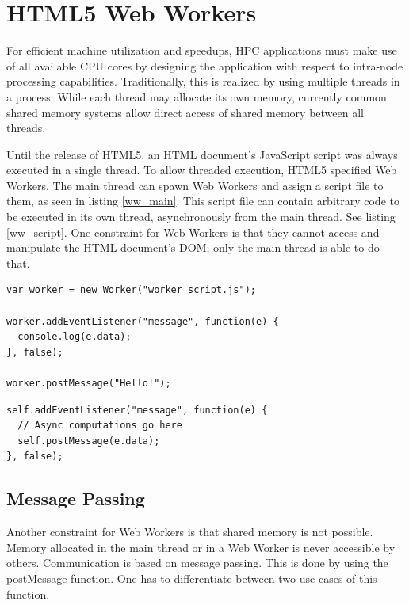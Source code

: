 \section{HTML5 Web Workers} \label{chapter_webworkers}

For efficient machine utilization and speedups, HPC applications must make use of all available CPU cores by designing the application with respect to intra-node processing capabilities. Traditionally, this is realized by using multiple threads in a process. While each thread may allocate its own memory, currently common shared memory systems allow direct access of shared memory between all threads. 

Until the release of HTML5, an HTML document's JavaScript script was always executed in a single thread. To allow threaded execution, HTML5 specified Web Workers. The main thread can spawn Web Workers and assign a script file to them, as seen in listing \ref{ww_main}. This script file can contain arbitrary code to be executed in its own thread, asynchronously from the main thread. See listing \ref{ww_script}. One constraint for Web Workers is that they cannot access and manipulate the HTML document's DOM; only the main thread is able to do that.

\begin{minipage}[c]{0.95\linewidth}
\begin{lstlisting}[frame=single,basicstyle=\footnotesize]
var worker = new Worker("worker_script.js");

worker.addEventListener("message", function(e) {
  console.log(e.data);
}, false);

worker.postMessage("Hello!");
\end{lstlisting}
\end{minipage}

\begin{lstlisting}[frame=single,basicstyle=\footnotesize]
self.addEventListener("message", function(e) {
  // Async computations go here
  self.postMessage(e.data);
}, false);
\end{lstlisting}


\subsection{Message Passing}

Another constraint for Web Workers is that shared memory is not possible. Memory allocated in the main thread or in a Web Worker is never accessible by others. Communication is based on message passing. This is done by using the postMessage function. One has to differentiate between two use cases of this function.

